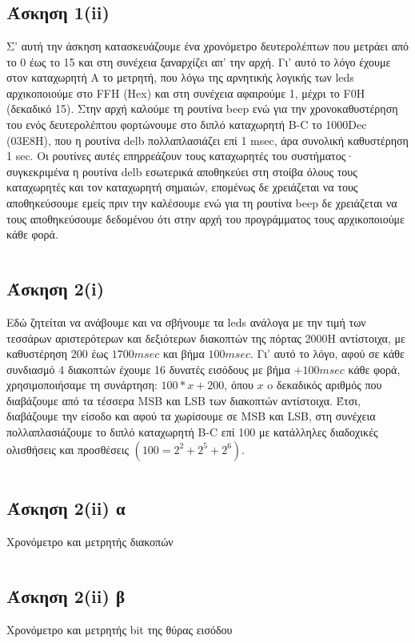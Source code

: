 \documentclass[a4paper,10pt]{article} \usepackage{anysize}
\begin{document}


\section*{} \setcounter{section}{1}
\subsection*{Άσκηση 1(ii)}\setcounter{subsection}{1}
Σ' αυτή την άσκηση κατασκευάζουμε ένα χρονόμετρο δευτερολέπτων που μετράει
από το 0 έως το 15 και στη συνέχεια ξαναρχίζει απ' την αρχή. Γι' αυτό το λόγο
έχουμε στον καταχωρητή Α το μετρητή, που λόγω της αρνητικής λογικής των leds
αρχικοποιούμε στο FFH (Hex) και στη συνέχεια αφαιρούμε 1, μέχρι το F0H
(δεκαδικό 15). Στην αρχή καλούμε τη ρουτίνα beep ενώ για την χρονοκαθυστέρηση
του ενός δευτερολέπτου φορτώνουμε στο διπλό καταχωρητή B-C το 1000Dec (03Ε8Η),
που η ρουτίνα delb πολλαπλασιάζει επί 1 msec, άρα συνολική καθυστέρηση 1 sec.
Οι ρουτίνες αυτές επηρρεάζουν τους καταχωρητές του συστήματος· συγκεκριμένα η
ρουτίνα delb εσωτερικά αποθηκεύει στη στοίβα όλους τους καταχωρητές και τον
καταχωρητή σημαιών, επομένως δε χρειάζεται να τους αποθηκεύσουμε εμείς πριν
την καλέσουμε ενώ για τη ρουτίνα beep δε χρειάζεται να τους αποθηκεύσουμε
δεδομένου ότι στην αρχή του προγράμματος τους αρχικοποιούμε κάθε φορά.
\inputminted[linenos,obeytabs,fontsize=\footnotesize]{oldasm}{../askhsh_1_ii.8085}
\subsection*{Άσκηση 2(i)}
Εδώ ζητείται να ανάβουμε και να σβήνουμε τα leds ανάλογα με την τιμή των
τεσσάρων  αριστερότερων και δεξιότερων διακοπτών της πόρτας 2000Η αντίστοιχα,
με καθυστέρηση $200$ έως $1700 msec$ και βήμα $100 msec$. Γι' αυτό το λόγο, αφού σε
κάθε συνδιασμό 4 διακοπτών έχουμε 16 δυνατές εισόδους με βήμα $+100msec$ κάθε
φορά, χρησιμοποιήσαμε τη συνάρτηση: $100 * x + 200$, όπου $x$ o δεκαδικός αριθμός
που διαβάζουμε από τα τέσσερα MSB και LSB των διακοπτών αντίστοιχα. Έτσι,
διαβάζουμε την είσοδο και αφού τα χωρίσουμε σε MSB και LSB, στη συνέχεια
πολλαπλασιάζουμε το διπλό καταχωρητή B-C επί 100 με κατάλληλες διαδοχικές
ολισθήσεις και προσθέσεις $(100= 2^2 + 2^5 + 2^6)$.
\inputminted[linenos,obeytabs,fontsize=\footnotesize]{oldasm}{../askhsh_2_i.8085}
\subsection*{Άσκηση 2(ii) α}
Χρονόμετρο και μετρητής διακοπών
\inputminted[linenos,obeytabs,fontsize=\footnotesize]{oldasm}{../askhsh_2_ii_a.8085}
\subsection*{Άσκηση 2(ii) β}
Χρονόμετρο και μετρητής bit της θύρας εισόδου
\inputminted[linenos,obeytabs,fontsize=\footnotesize]{oldasm}{../askhsh_2_ii_b.8085}
\end{document}

